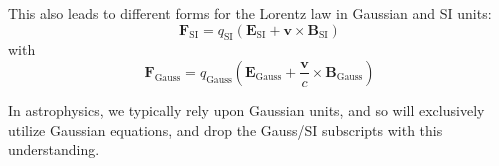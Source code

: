 \documentclass[notoc]{tufte-handout}
\renewcommand{\vec}[1]{\mathbf{#1}}
\begin{document}
This also leads to different forms for the Lorentz law in Gaussian and SI units:
\begin{equation}
    \vec{F}_{\text{SI}} = q_{\text{SI}} \left( \vec{E}_{\text{SI}} + \vec{v}\times \vec{B}_{\text{SI}} \right)
\end{equation}
with
\begin{equation}
\vec{F}_{\text{Gauss}} = q_{\text{Gauss}} \left( \vec{E}_{\text{Gauss}} + \frac{\vec{v}}{c} \times \vec{B}_{\text{Gauss}} \right)
\end{equation}


In astrophysics, we typically rely upon Gaussian units, and so will exclusively utilize Gaussian equations, and drop the Gauss/SI subscripts with this understanding.
\end{document}
